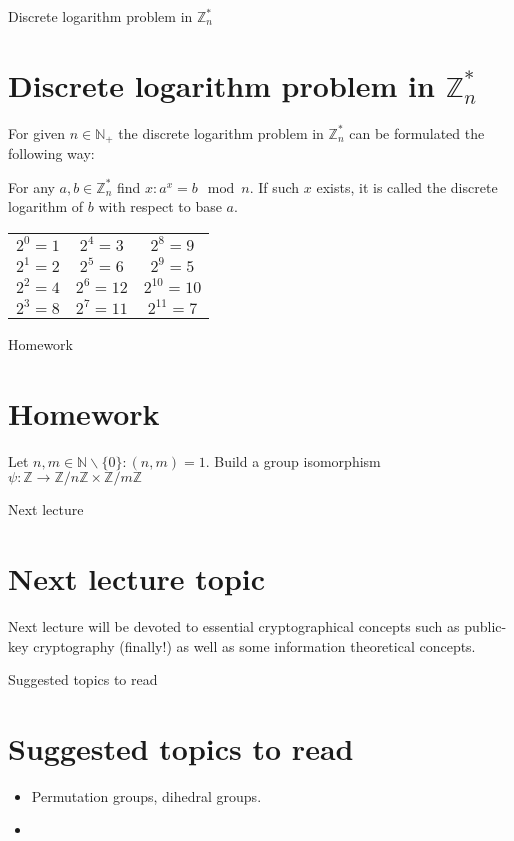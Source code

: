 \documentclass{beamer}
\begin{document}
\begin{frame}{Discrete logarithm problem in $\mathbb{Z}^*_n$}
	\section{Discrete logarithm problem in $\mathbb{Z}^*_n$}
	\begin{block}{}
		For given $n \in \mathbb{N}_+$ the discrete logarithm problem in $\mathbb{Z}^*_n$ can be formulated the 
		following way:
	\end{block}
	
	\begin{block}{}
		For any $a, b \in \mathbb{Z}^*_n$ find $x : a^x = b \mod n$. If such $x$ exists, it is called the discrete 
		logarithm of $b$ with respect to base $a$.
	\end{block}
	
	\begin{example}
		\begin{tabular}{>{\small}c>{\small}c>{\small}c}
			$2^0 = 1$ & $2^4 = 3$ & $2^8 = 9$ \\
			$2^1 = 2$ & $2^5 = 6$ & $2^9 = 5$ \\
			$2^2 = 4$ & $2^6 = 12$ & $2^{10} = 10$ \\
			$2^3 = 8$ & $2^7 = 11$ & $2^{11} = 7$
		\end{tabular}
	\end{example}
\end{frame}

\begin{frame}{Homework}
    \section{Homework}
	Let $n, m \in \mathbb{N} \backslash \{0\} : (n, m) = 1$. \newline
	Build a group isomorphism 
	$\psi : \mathbb{Z} \to \mathbb{Z} / n \mathbb{Z} \times \mathbb{Z} / m \mathbb{Z}$
\end{frame}

\begin{frame}{Next lecture}
    \section{Next lecture topic}
	Next lecture will be devoted to essential cryptographical concepts such as public-key cryptography (finally!) as 
	well as some information theoretical concepts. 
\end{frame}

\begin{frame}{Suggested topics to read}
    \section{Suggested topics to read}
    \begin{itemize}
		\item Permutation groups, dihedral groups.
		\item 
	\end{itemize}    
\end{frame}
\end{document}
